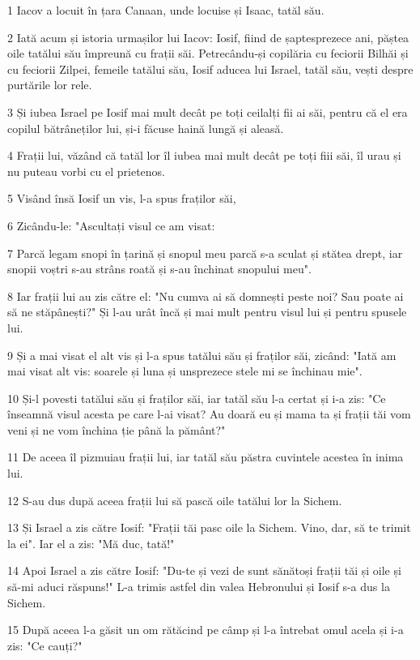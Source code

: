 \par 1 Iacov a locuit în țara Canaan, unde locuise și Isaac, tatăl său.
\par 2 Iată acum și istoria urmașilor lui Iacov: Iosif, fiind de șaptesprezece ani, păștea oile tatălui său împreună cu frații săi. Petrecându-și copilăria cu feciorii Bilhăi și cu feciorii Zilpei, femeile tatălui său, Iosif aducea lui Israel, tatăl său, vești despre purtările lor rele.
\par 3 Și iubea Israel pe Iosif mai mult decât pe toți ceilalți fii ai săi, pentru că el era copilul bătrâneților lui, și-i făcuse haină lungă și aleasă.
\par 4 Frații lui, văzând că tatăl lor îl iubea mai mult decât pe toți fiii săi, îl urau și nu puteau vorbi cu el prietenos.
\par 5 Visând însă Iosif un vis, l-a spus fraților săi,
\par 6 Zicându-le: "Ascultați visul ce am visat:
\par 7 Parcă legam snopi în țarină și snopul meu parcă s-a sculat și stătea drept, iar snopii voștri s-au strâns roată și s-au închinat snopului meu".
\par 8 Iar frații lui au zis către el: "Nu cumva ai să domnești peste noi? Sau poate ai să ne stăpânești?" Și l-au urât încă și mai mult pentru visul lui și pentru spusele lui.
\par 9 Și a mai visat el alt vis și l-a spus tatălui său și fraților săi, zicând: "Iată am mai visat alt vis: soarele și luna și unsprezece stele mi se închinau mie".
\par 10 Și-l povesti tatălui său și fraților săi, iar tatăl său l-a certat și i-a zis: "Ce înseamnă visul acesta pe care l-ai visat? Au doară eu și mama ta și frații tăi vom veni și ne vom închina ție până la pământ?"
\par 11 De aceea îl pizmuiau frații lui, iar tatăl său păstra cuvintele acestea în inima lui.
\par 12 S-au dus după aceea frații lui să pască oile tatălui lor la Sichem.
\par 13 Și Israel a zis către Iosif: "Frații tăi pasc oile la Sichem. Vino, dar, să te trimit la ei". Iar el a zis: "Mă duc, tată!"
\par 14 Apoi Israel a zis către Iosif: "Du-te și vezi de sunt sănătoși frații tăi și oile și să-mi aduci răspuns!" L-a trimis astfel din valea Hebronului și Iosif s-a dus la Sichem.
\par 15 După aceea l-a găsit un om rătăcind pe câmp și l-a întrebat omul acela și i-a zis: "Ce cauți?"
